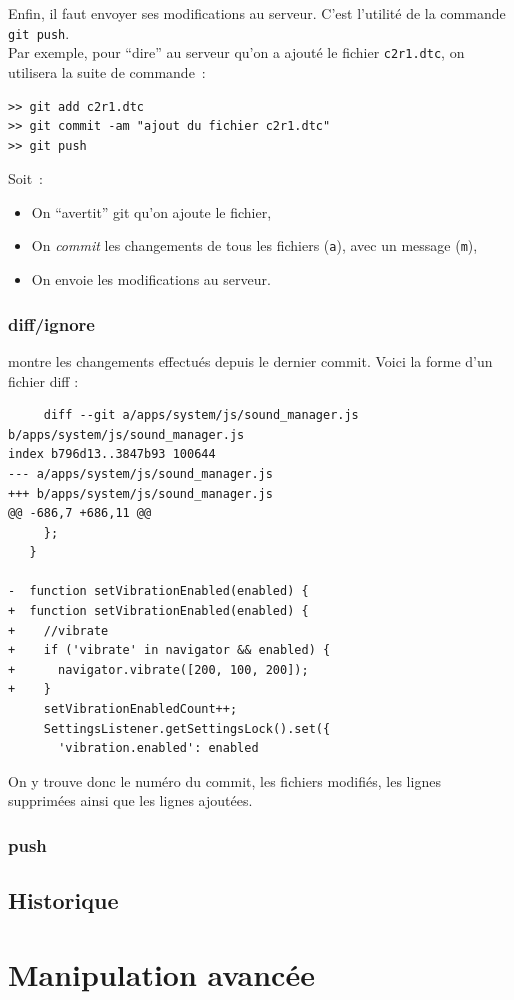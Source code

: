 \documentclass[a4paper,10pt]{report}
\begin{document}
Enfin, il faut envoyer ses modifications au serveur. C'est l'utilit\'e de la commande \verb|git push|. \\

Par exemple, pour ``dire'' au serveur qu'on a ajout\'e le fichier \verb|c2r1.dtc|, on utilisera la suite de commande~:
\begin{verbatim}
>> git add c2r1.dtc
>> git commit -am "ajout du fichier c2r1.dtc"
>> git push
\end{verbatim}

Soit~:
\begin{itemize}
 \item On ``avertit'' git qu'on ajoute le fichier,
 \item On \emph{commit} les changements de tous les fichiers (\verb|a|), avec un message (\verb|m|),
 \item On envoie les modifications au serveur.
\end{itemize}


     \subsection{diff/ignore}
montre les changements effectués depuis le dernier commit. Voici la forme d'un fichier diff :
\begin{verbatim}
     diff --git a/apps/system/js/sound_manager.js b/apps/system/js/sound_manager.js
index b796d13..3847b93 100644
--- a/apps/system/js/sound_manager.js
+++ b/apps/system/js/sound_manager.js
@@ -686,7 +686,11 @@
     };
   }
 
-  function setVibrationEnabled(enabled) {
+  function setVibrationEnabled(enabled) {    
+    //vibrate
+    if ('vibrate' in navigator && enabled) {
+      navigator.vibrate([200, 100, 200]);
+    }
     setVibrationEnabledCount++;
     SettingsListener.getSettingsLock().set({
       'vibration.enabled': enabled
\end{verbatim}   
     On y trouve donc le numéro du commit, les fichiers modifiés, les lignes supprimées ainsi que les lignes ajoutées.
     \subsection{push}
  \section{Historique}
\chapter{Manipulation avancée}
\end{document}
